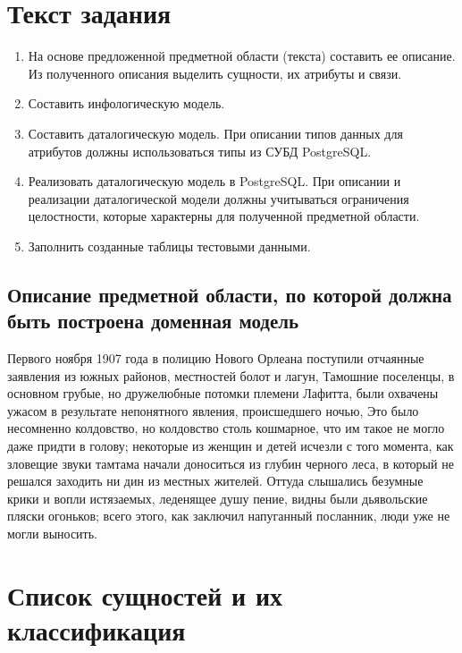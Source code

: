 \documentclass{article}
\begin{document}
\itmo[
  variant=371364,
  labn=1,
  discipline=Информационные системы и базы данных,
  group=P3115,
  student=Владимир Мацюк,
  teacher=Горбунов Михаил Витальевич,
  year=2023,
  logo=../../lib/img/itmo.png
]

\section{Текст задания}
\begin{enumerate}
  \item На основе предложенной предметной области (текста) составить ее описание. Из полученного описания выделить сущности, их атрибуты и связи.
  \item Составить инфологическую модель.
  \item Составить даталогическую модель. При описании типов данных для атрибутов должны использоваться типы из СУБД PostgreSQL.
  \item Реализовать даталогическую модель в PostgreSQL. При описании и реализации даталогической модели должны учитываться ограничения целостности, которые характерны для полученной предметной области.
  \item Заполнить созданные таблицы тестовыми данными.
\end{enumerate}
\subsection{Описание предметной области, по которой должна быть построена доменная модель}

Первого ноября 1907 года в полицию Нового Орлеана поступили отчаянные заявления из южных районов, местностей болот и лагун, Тамошние поселенцы, в основном грубые, но дружелюбные потомки племени Лафитта, были охвачены ужасом в результате непонятного явления, происшедшего ночью, Это было несомненно колдовство, но колдовство столь кошмарное, что им такое не могло даже придти в голову; некоторые из женщин и детей исчезли с того момента, как зловещие звуки тамтама начали доноситься из глубин черного леса, в который не решался заходить ни дин из местных жителей. Оттуда слышались безумные крики и вопли истязаемых, леденящее душу пение, видны были дьявольские пляски огоньков; всего этого, как заключил напуганный посланник, люди уже не могли выносить.

\section{Список сущностей и их классификация}
\end{document}
